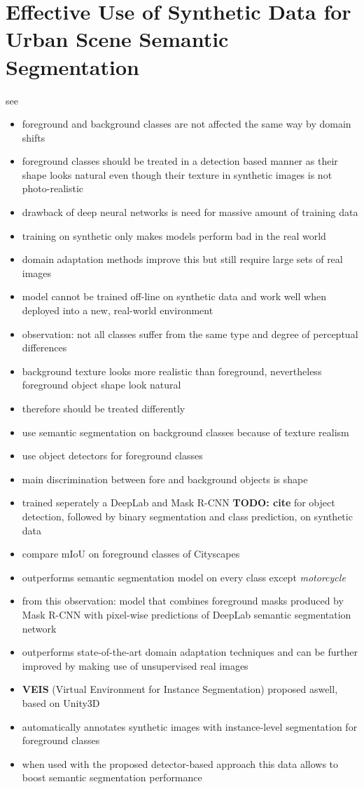 \documentclass[]{article}
\newcommand{\todo}[1]{{\color{red}\bf{TODO: #1}}}
\begin{document}
\section{Effective Use of Synthetic Data for Urban Scene Semantic Segmentation}

see \cite{DBLP:journals/corr/abs-1807-06132}

\begin{itemize}
	\item foreground and background classes are not affected the same way by domain shifts
	\item foreground classes should be treated in a detection based manner as their shape looks natural even though their texture in synthetic images is not photo-realistic
	\item drawback of deep neural networks is need for massive amount of training data
	\item training on synthetic only makes models perform bad in the real world
	\item domain adaptation methods improve this but still require large sets of real images
	\item model cannot be trained off-line on synthetic data and work well when deployed into a new, real-world environment
	\item observation: not all classes suffer from the same type and degree of perceptual differences
	\item background texture looks more realistic than foreground, nevertheless foreground object shape look natural
	\item therefore should be treated differently
	\item use semantic segmentation on background classes because of texture realism
	\item use object detectors for foreground classes
	\item main discrimination between fore and background objects is shape
	\item trained seperately a DeepLab and Mask R-CNN \todo{cite} for object detection, followed by binary segmentation and class prediction, on synthetic data
	\item compare mIoU on foreground classes of Cityscapes
	\item outperforms semantic segmentation model on every class except \textit{motorcycle}
	\item from this observation: model that combines foreground masks produced by Mask R-CNN with pixel-wise predictions of DeepLab semantic segmentation network
	\item outperforms state-of-the-art domain adaptation techniques and can be further improved by making use of unsupervised real images
	\item \textbf{VEIS} (Virtual Environment for Instance Segmentation) proposed aswell, based on Unity3D
	\item automatically annotates synthetic images with instance-level segmentation for foreground classes
	\item when used with the proposed detector-based approach this data allows to boost semantic segmentation performance
\end{itemize}
\end{document}
